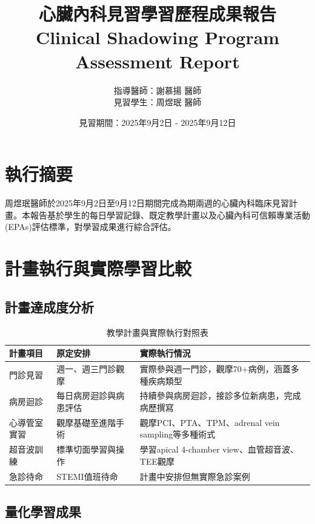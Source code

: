 \documentclass[12pt,a4paper]{article}
\title{\Large \textbf{心臟內科見習學習歷程成果報告}\\
\large Clinical Shadowing Program Assessment Report}
\author{指導醫師：謝慕揚 醫師\\
見習學生：周煜珉 醫師}
\date{見習期間：2025年9月2日 - 2025年9月12日}
\begin{document}
\maketitle

\section{執行摘要}

周煜珉醫師於2025年9月2日至9月12日期間完成為期兩週的心臟內科臨床見習計畫。本報告基於學生的每日學習記錄、既定教學計畫以及心臟內科可信賴專業活動(EPAs)評估標準，對學習成果進行綜合評估。

\section{計畫執行與實際學習比較}

\subsection{計畫達成度分析}

\begin{table}[h]
\centering
\caption{教學計畫與實際執行對照表}
\begin{tabular}{|p{3cm}|p{5cm}|p{6cm}|}
\hline
\textbf{計畫項目} & \textbf{原定安排} & \textbf{實際執行情況} \\
\hline
門診見習 & 週一、週三門診觀摩 & 實際參與週一門診，觀摩70+病例，涵蓋多種疾病類型 \\
\hline
病房迴診 & 每日病房迴診與病患評估 & 持續參與病房迴診，接診多位新病患，完成病歷撰寫 \\
\hline
心導管室實習 & 觀摩基礎至進階手術 & 觀摩PCI、PTA、TPM、adrenal vein sampling等多種術式 \\
\hline
超音波訓練 & 標準切面學習與操作 & 學習apical 4-chamber view、血管超音波、TEE觀摩 \\
\hline
急診待命 & STEMI值班待命 & 計畫中安排但無實際急診案例 \\
\hline
\end{tabular}
\end{table}

\subsection{量化學習成果}
\end{document}

